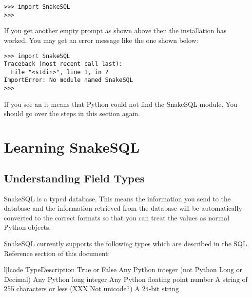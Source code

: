 \documentclass{howto}
\begin{document}
\begin{verbatim}
>>> import SnakeSQL
>>> 
\end{verbatim}

If you get another empty prompt as shown above then the installation has worked. You may get an error message like the one shown below:

\begin{verbatim}
>>> import SnakeSQL
Traceback (most recent call last):
  File "<stdin>", line 1, in ?
ImportError: No module named SnakeSQL
>>>
\end{verbatim}

If you see an  it means that Python could not find the SnakeSQL module. You should go over the steps in this section again.

\section{Learning SnakeSQL}

\subsection{Understanding Field Types}

SnakeSQL is a typed database. This means the information you send to the database and the information retrieved from the database will be automatically converted to the correct formats so that you can treat the values as normal Python objects.

SnakeSQL currently supports the following types which are described in the SQL Reference section of this document:

\begin{tableii}{l|l}{code}%
  {Type}{Description}
      {True or False}
   {Any Python integer (not Python Long or Decimal)}
      {Any Python long integer}
     {Any Python floating point number}
    {A string of 255 characters or less (XXX Not unicode?)}
      {A 24-bit string}
\end{tableii}
\end{document}

